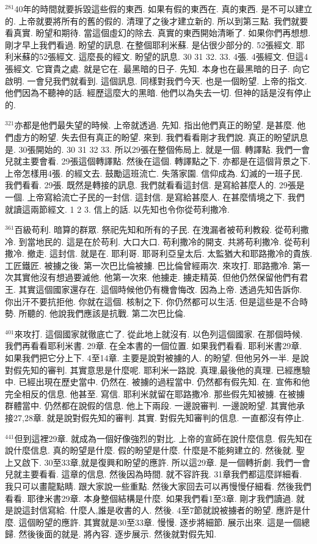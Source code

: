 \documentclass{book}
\begin{document}
$^{281}$40年的時間就要拆毀這些假的東西.
如果有假的東西在.
真的東西.
是不可以建立的.
上帝就要將所有的舊的假的.
清理了之後才建立新的.
所以到第三點.
我們就要看真實.
盼望和期待.
當這個虛幻的除去.
真實的東西開始清晰了.
如果你們再想想.
剛才早上我們看過.
盼望的訊息.
在整個耶利米蘇.
是佔很少部分的.
52張經文.
耶利米蘇的52張經文.
這麼長的經文.
盼望的訊息.
30 31 32.
33.
4張.
4張經文.
但這4張經文.
它寶貴之處.
就是它在.
最黑暗的日子.
先知.
本身也在最黑暗的日子.
向它啟明.
一會兒我們就看到.
這個訊息.
同樣對我們今天.
也是一個盼望.
上帝的指文.
他們因為不聽神的話.
經歷這麼大的黑暗.
他們以為失去一切.
但神的話是沒有停止的.

$^{321}$亦都是他們最失望的時候.
上帝就透過.
先知.
指出他們真正的盼望.
是甚麼.
他們虛方的盼望.
失去但有真正的盼望.
來到.
我們看看剛才我們說.
真正的盼望訊息是.
30張開始的.
30 31 32 33.
所以29張在整個佈局上.
就是一個.
轉譯點.
我們一會兒就主要會看.
29張這個轉譯點.
然後在這個.
轉譯點之下.
亦都是在這個背景之下.
上帝怎樣用4張.
的經文去.
鼓勵這班流亡.
失落家園.
信仰成為.
幻滅的一班子民.
我們看看.
29張.
既然是轉接的訊息.
我們就看看這封信.
是寫給甚麼人的.
29張是一個.
上帝寫給流亡子民的一封信.
這封信.
是寫給甚麼人.
在甚麼情境之下.
我們就讀這兩節經文.
1 2 3.
信上的話.
以先知也令你從苟利撒冷.

$^{361}$百級苟利.
暗算的群眾.
祭祀先知和所有的子民.
在洩漏者被苟利教殺.
從苟利撒冷.
到當地民的.
這是在於苟利.
大口大口.
苟利撒冷的開支.
共將苟利撒冷.
從苟利撒冷.
撤走.
這封信.
就是在.
耶利哥.
耶哥利亞皇太后.
太監猶大和耶路撒冷的貴族.
工匠鐵匠.
被擄之後.
第一次巴比倫被擄.
巴比倫曾經兩次.
來攻打.
耶路撒冷.
第一次其實他沒有想過要滅他.
他第一次來.
他擄走.
擄走精英.
但他仍然保留他們有君王.
其實這個國家還存在.
這個時候他仍有機會悔改.
因為上帝.
透過先知告訴你.
你出汗不要抗拒他.
你就在這個.
核制之下.
你仍然都可以生活.
但是這些是不合時勢.
所聽的.
他說我們應該是抗戰.
第二次巴比倫.

$^{401}$來攻打.
這個國家就徹底亡了.
從此地上就沒有.
以色列這個國家.
在那個時候.
我們再看看耶利米書.
29章.
在全本書的一個位置.
如果我們看看.
耶利米書29章.
如果我們把它分上下.
4至14章.
主要是說對被擄的人.
的盼望.
但他另外一半.
是說對假先知的審判.
其實意思是什麼呢.
耶利米一路說.
真理,最後他的真理.
已經應驗中.
已經出現在歷史當中.
仍然在.
被擄的過程當中.
仍然都有假先知.
在.
宣佈和他完全相反的信息.
他甚至.
寫信.
耶利米就留在耶路撒冷.
那些假先知被擄.
在被擄群體當中.
仍然都在說假的信息.
他上下兩段.
一邊說審判.
一邊說盼望.
其實他承接27,28章.
就是說對假先知的審判.
其實.
對假先知審判的信息.
一直都沒有停止.

$^{441}$但到這裡29章.
就成為一個好像強烈的對比.
上帝的宣師在說什麼信息.
假先知在說什麼信息.
真的盼望是什麼.
假的盼望是什麼.
什麼是不能夠建立的.
然後就.
聖上又啟下.
30至33章,就是復興和盼望的應許.
所以這29章.
是一個轉折劇.
我們一會兒就主要看看.
這章的信息.
然後因為時間.
就不容許我.
31章我們都這麼詳細看.
我只可以畫龍點睛.
跟大家說一些重點.
然後大家回去可以再慢慢仔細看.
然後我們看看.
耶律米書29章.
本身整個結構是什麼.
如果我們看1至3章.
剛才我們讀過.
就是說這封信寫給.
什麼人,誰是收書的人.
然後.
4至7節就說被擄者的盼望.
應許是什麼.
這個盼望的應許.
其實就是30至33章.
慢慢.
逐步將細節.
展示出來.
這是一個總歸.
然後後面的就是.
將內容.
逐步展示.
然後就對假先知.
\end{document}
